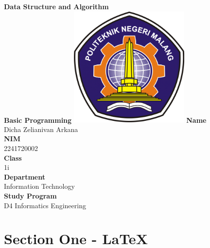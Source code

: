 \documentclass[12pt,titlepage]{article}
\newcommand{\vSubject}{Data Structure and Algorithm}
\newcommand{\vSubtitle}{Basic Programming}
\newcommand{\vName}{Dicha Zelianivan Arkana}
\newcommand{\vNIM}{2241720002}
\newcommand{\vClass}{1i}
\newcommand{\vDepartment}{Information Technology}
\newcommand{\vStudyProgram}{D4 Informatics Engineering}
\begin{document}
\begin{titlepage}
    \centering
    \vfill
    {\bfseries\LARGE
        \vSubject\\
        \vskip0.25cm
        \vSubtitle
    }
    \vfill
    \includegraphics[width=6cm]{images/polinema-logo.png}
    \vfill
    {
        \textbf{Name}\\
        \vName\\
        \vskip0.5cm
        \textbf{NIM}\\
        \vNIM\\
        \vskip0.5cm
        \textbf{Class}\\
        \vClass\\
        \vskip0.5cm
        \textbf{Department}\\
        \vDepartment\\
        \vskip0.5cm
        \textbf{Study Program}\\
        \vStudyProgram
    }
\end{titlepage}

\section{Section One - \LaTeX}
\end{document}
